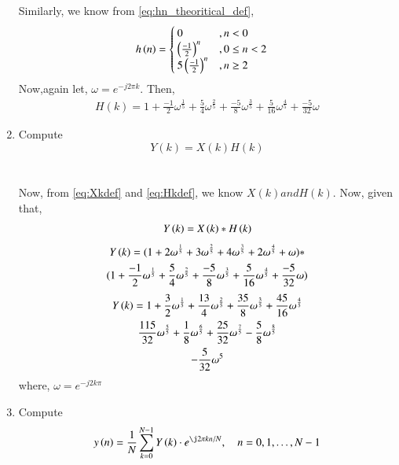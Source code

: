 \documentclass[journal,12pt,twocolumn]{IEEEtran}
\renewcommand\thesection{\arabic{section}}
\begin{document}
\begin{enumerate}[label=\thesection.\arabic*]
Similarly, we know from \eqref{eq:hn_theoritical_def},
\begin{align}
	h\left(n\right) &= \begin{cases}
					 0 &, n < 0\\
					 \left(\frac{-1}{2}\right)^n &, 0\leq n<2\\
					 5\left(\frac{-1}{2}\right)^n &, n \geq 2
				  \end{cases}
\end{align}
Now,again let, $\omega=e^{-j2\pi k}$. Then,
\begin{align}
	H(k)=1+\frac{-1}{2}\omega^{\frac{1}{5}}+\frac{5}{4}\omega^{\frac{2}{5}}+\frac{-5}{8}\omega^{\frac{3}{5}}+\frac{5}{16}\omega^{\frac{4}{5}}+\frac{-5}{32}\omega
	\label{eq:Hkdef}
\end{align}
\item Compute 
\begin{equation}
Y(k) = X(k)H(k)
\end{equation}
\\\solution\\Now, from \eqref{eq:Xkdef} and \eqref{eq:Hkdef}, we know $X(k) and H(k)$. Now, given that,
\begin{equation}
	Y\left(k\right)=X\left(k\right)*H\left(k\right)
\end{equation}
\begin{multline}
	Y\left(k\right)= (1+2\omega^{\frac{1}{5}}+3\omega^{\frac{2}{5}}+4\omega^{\frac{3}{5}}+2\omega^{\frac{4}{5}}+\omega)* \\(1+\frac{-1}{2}\omega^{\frac{1}{5}}+\frac{5}{4}\omega^{\frac{2}{5}}+\frac{-5}{8}\omega^{\frac{3}{5}}+\frac{5}{16}\omega^{\frac{4}{5}}+\frac{-5}{32}\omega)
\end{multline}
\begin{multline}
	Y\left(k\right)= 1+\frac{3}{2}\omega^{\frac{1}{5}}+\frac{13}{4}\omega^{\frac{2}{5}}+\frac{35}{8}\omega^{\frac{3}{5}}+\frac{45}{16}\omega^{\frac{4}{5}}\\\frac{115}{32}\omega^{\frac{5}{5}}+\frac{1}{8}\omega^{\frac{6}{5}}+\frac{25}{32}\omega^{\frac{7}{5}}-\frac{5}{8}\omega^{\frac{8}{5}}\\-\frac{5}{32}\omega^{5} 
\end{multline}
where, $\omega=e^{-j2k\pi}$
\item Compute
\begin{equation}
 y\brak{n}={\frac {1}{N}}\sum _{k=0}^{N-1}Y\brak{k}\cdot e^{\j 2\pi kn/N},\quad n = 0,1,\dots, N-1
\end{equation}

\end{enumerate}
\end{document}
